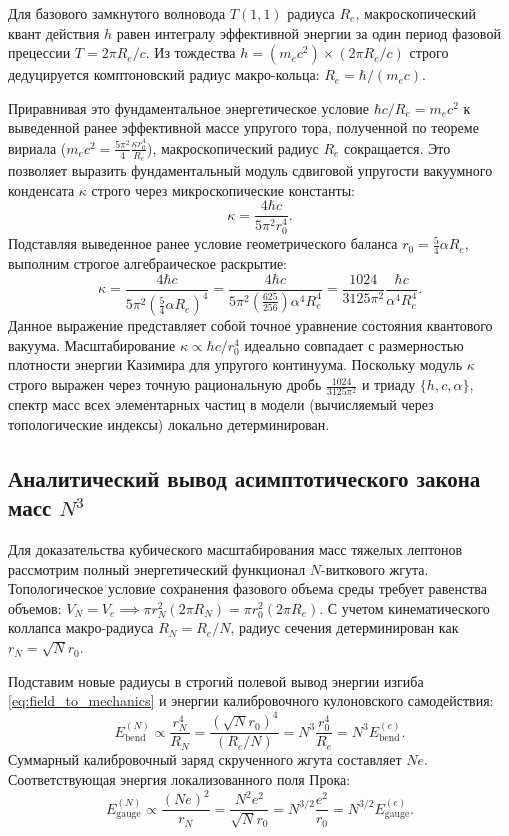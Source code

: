 \documentclass[11pt,a4paper]{article}
\begin{document}
Для базового замкнутого волновода $T(1,1)$ радиуса $R_e$, макроскопический квант действия $h$ равен интегралу эффективной энергии за один период фазовой прецессии $T = 2\pi R_e/c$. Из тождества $h = (m_e c^2) \times (2\pi R_e/c)$ строго дедуцируется комптоновский радиус макро-кольца: $R_e = \hbar / (m_e c)$. 

Приравнивая это фундаментальное энергетическое условие $\hbar c / R_e = m_e c^2$ к выведенной ранее эффективной массе упругого тора, полученной по теореме вириала ($m_e c^2 = \frac{5\pi^2}{4} \frac{\kappa r_0^4}{R_e}$), макроскопический радиус $R_e$ сокращается. Это позволяет выразить фундаментальный модуль сдвиговой упругости вакуумного конденсата $\kappa$ строго через микроскопические константы:
\begin{equation}
\kappa = \frac{4 \hbar c}{5\pi^2 r_0^4}.
\end{equation}
Подставляя выведенное ранее условие геометрического баланса $r_0 = \frac{5}{4}\alpha R_e$, выполним строгое алгебраическое раскрытие:
\begin{equation}
\kappa = \frac{4 \hbar c}{5\pi^2 \left( \frac{5}{4}\alpha R_e \right)^4} = \frac{4 \hbar c}{5\pi^2 \left( \frac{625}{256} \right) \alpha^4 R_e^4} = \frac{1024}{3125 \pi^2} \frac{\hbar c}{\alpha^4 R_e^4}.
\end{equation}
Данное выражение представляет собой точное уравнение состояния квантового вакуума. Масштабирование $\kappa \propto \hbar c / r_0^4$ идеально совпадает с размерностью плотности энергии Казимира для упругого континуума. 
Поскольку модуль $\kappa$ строго выражен через точную рациональную дробь $\frac{1024}{3125\pi^2}$ и триаду $\{h, c, \alpha\}$, спектр масс всех элементарных частиц в модели (вычисляемый через топологические индексы) локально детерминирован.

\subsection{Аналитический вывод асимптотического закона масс $N^3$}
Для доказательства кубического масштабирования масс тяжелых лептонов рассмотрим полный энергетический функционал $N$-виткового жгута. Топологическое условие сохранения фазового объема среды требует равенства объемов: $V_N = V_e \implies \pi r_N^2 (2\pi R_N) = \pi r_0^2 (2\pi R_e)$. С учетом кинематического коллапса макро-радиуса $R_N = R_e / N$, радиус сечения детерминирован как $r_N = \sqrt{N} r_0$.

Подставим новые радиусы в строгий полевой вывод энергии изгиба \eqref{eq:field_to_mechanics} и энергии калибровочного кулоновского самодействия:
\begin{equation}
	E_{\text{bend}}^{(N)} \propto \frac{r_N^4}{R_N} = \frac{(\sqrt{N} r_0)^4}{(R_e / N)} = N^3 \frac{r_0^4}{R_e} = N^3 E_{\text{bend}}^{(e)}.
\end{equation}
Суммарный калибровочный заряд скрученного жгута составляет $N e$. Соответствующая энергия локализованного поля Прока:
\begin{equation}
	E_{\text{gauge}}^{(N)} \propto \frac{(Ne)^2}{r_N} = \frac{N^2 e^2}{\sqrt{N} r_0} = N^{3/2} \frac{e^2}{r_0} = N^{3/2} E_{\text{gauge}}^{(e)}.
\end{equation}
\end{document}
